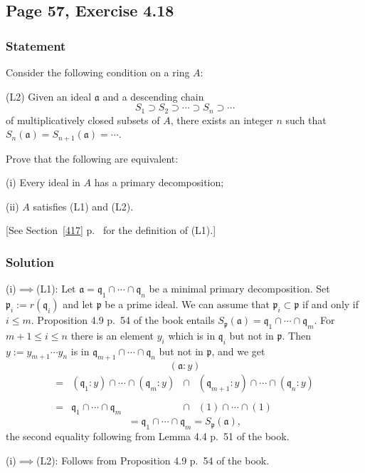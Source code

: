 \documentclass[parskip=half,fontsize=12pt]{scrartcl}%
\newcommand{\mf}{\mathfrak}
\newcommand{\aaa}{\mf a}
\newcommand{\ppp}{\mf p}
\newcommand{\qqq}{\mf q}
\begin{document}
\subsection{Page 57, Exercise 4.18}%

\subsubsection{Statement}%

Consider the following condition on a ring $A$:

(L2) Given an ideal $\mathfrak a$ and a descending chain 
$$
S_1\supset S_2\supset\cdots\supset S_n\supset\cdots
$$ 
of multiplicatively closed subsets of $A$, there exists an integer $n$ such that $S_n(\mathfrak a)=S_{n+1}(\mathfrak a)=\cdots$. %

Prove that the following are equivalent:

(i) Every ideal in $A$ has a primary decomposition;

(ii) $A$ satisfies (L1) and (L2).

[See Section~\ref{417} p.~\pageref{417} for the definition of (L1).]

\subsubsection{Solution}%

(i)$\implies$(L1): Let $\aaa=\qqq_1\cap\cdots\cap\qqq_n$ be a minimal primary decomposition. Set $\ppp_i:=r(\qqq_i)$ and let $\ppp$ be a prime ideal. We can assume that $\ppp_i\subset\ppp$ if and only if $i\le m$. Proposition 4.9 p.~54 of the book entails $S_\ppp(\aaa)=\qqq_1\cap\cdots\cap\qqq_m$. For $m+1\le i\le n$ there is an element $y_i$ which is in $\qqq_i$ but not in $\ppp$. Then $y:=y_{m+1}\cdots y_n$ is in $\qqq_{m+1}\cap\cdots\cap\qqq_n$ but not in $\ppp$, and we get 
$$
(\aaa:y)
$$
$$
\begin{matrix}
=&(\qqq_1:y)\cap\cdots\cap(\qqq_m:y)&\cap&(\qqq_{m+1}:y)\cap\cdots\cap(\qqq_n:y)\\ \\ 
=&\qqq_1\cap\cdots\cap\qqq_m&\cap&(1)\cap\cdots\cap(1)
\end{matrix}
$$
$$
=\qqq_1\cap\cdots\cap\qqq_m=S_\ppp(\aaa),
$$ 
the second equality following from Lemma 4.4 p.~51 of the book.

(i)$\implies$(L2): Follows from Proposition 4.9 p.~54 of the book.
\end{document}
